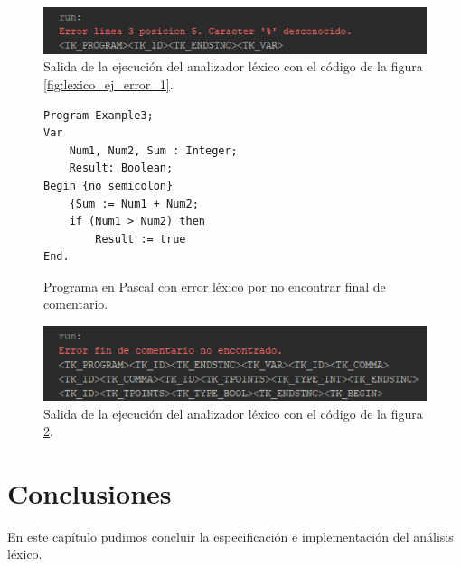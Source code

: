 \begin{figure}[H]
\centering
\includegraphics[scale=1]{img/lexico/salida_lexico_ej_error_1.png}
\caption{Salida de la ejecución del analizador léxico con el código de la figura \ref{fig:lexico_ej_error_1}.}
\label{fig:lexico_ej_error_1_salida}
\end{figure}

\begin{figure}[H]
\begin{verbatim}
Program Example3;
Var       
    Num1, Num2, Sum : Integer;
    Result: Boolean;
Begin {no semicolon}
    {Sum := Num1 + Num2;
    if (Num1 > Num2) then
        Result := true
End.
\end{verbatim}
\caption{Programa en Pascal con error léxico por no encontrar final de comentario.}
\label{fig:lexico_ej_error_2}
\end{figure}

\begin{figure}[H]
\centering
\includegraphics[scale=1]{img/lexico/salida_lexico_ej_error_2.png}
\caption{Salida de la ejecución del analizador léxico con el código de la figura \ref{fig:lexico_ej_error_2}.}
\label{fig:lexico_ej_error_2_salida}
\end{figure}

\section{Conclusiones}
En este capítulo pudimos concluir la especificación e implementación del análisis léxico.

